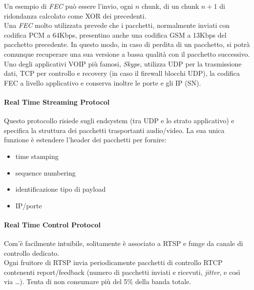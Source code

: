 Un esempio di \textit{FEC} può essere l'invio, ogni $ n $ chunk, di un chunk $ n + 1 $ di ridondanza calcolato come XOR dei precedenti.\\
Una \textit{FEC} molto utilizzata prevede che i pacchetti, normalmente inviati con codifica PCM a 64Kbps, presentino anche una codifica GSM a 13Kbps del pacchetto precedente. In questo modo, in caso di perdita di un pacchetto, si potrà comunque recuperare una sua versione a bassa qualità con il pacchetto successivo.\\
Uno degli applicativi VOIP più famosi, \textit{Skype}, utilizza UDP per la trasmissione dati, TCP per controllo e recovery (in caso il firewall blocchi UDP), la codifica FEC a livello applicativo e conserva inoltre le porte e gli IP (SN).

\paragraph{Real Time Streaming Protocol}
Questo protocollo risiede sugli endsystem (tra UDP e lo strato applicativo) e specifica la struttura dei pacchetti trasportanti audio/video. La sua unica funzione è estendere l'header dei pacchetti per fornire:
\begin{itemize}
    \item time stamping
    \item sequence numbering
    \item identificazione tipo di payload
    \item IP/porte
\end{itemize}

\paragraph{Real Time Control Protocol}
Com'è facilmente intuibile, solitamente è associato a RTSP e funge da canale di controllo dedicato.\\
Ogni fruitore di RTSP invia periodicamente pacchetti di controllo RTCP contenenti report/feedback (numero di pacchetti inviati e ricevuti, \textit{jitter}, e così via \ldots). Tenta di non consumare più del 5\% della banda totale.
